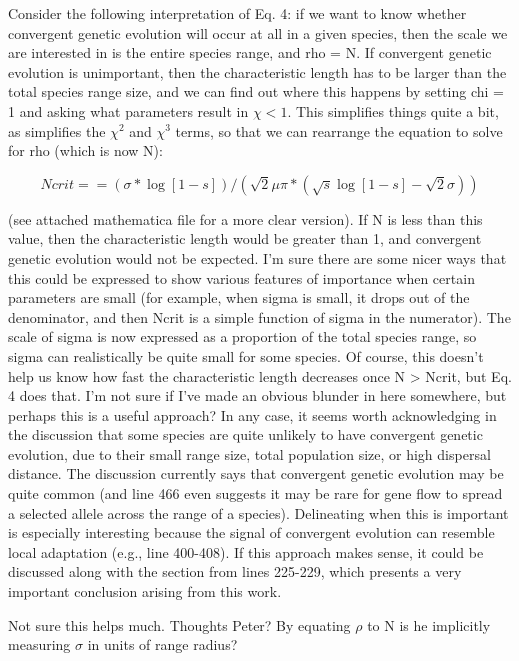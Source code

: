 \documentclass[12pt,letterpaper]{article}
\newcommand{\gc}[1]{{ \color{red} #1}}
\begin{document}
Consider the following interpretation of Eq. 4: if we want to know whether convergent genetic evolution will occur at all in a given species, then the scale we are interested in is the entire species range, and rho = N. If convergent genetic evolution is unimportant, then the characteristic length has to be larger than the total species range size, and we can find out where this happens by setting chi = 1 and asking what parameters result in $\chi < 1$. This simplifies things quite a bit, as simplifies the $\chi^2$ and $\chi^3$ terms, so that we can rearrange the equation to solve for rho (which is now N):

$$Ncrit == (\sigma * \log[1-s]) / (\sqrt{2}  \mu  \pi * (\sqrt{s} \log[1-s] - \sqrt{2}\sigma) )$$

(see attached mathematica file for a more clear version). If N is less than this value, then the characteristic length would be greater than 1, and convergent genetic evolution would not be expected. I'm sure there are some nicer ways that this could be expressed to show various features of importance when certain parameters are small (for example, when sigma is small, it drops out of the denominator, and then Ncrit is a simple function of sigma in the numerator). The scale of sigma is now expressed as a proportion of the total species range, so sigma can realistically be quite small for some species. Of course, this doesn't help us know how fast the characteristic length decreases once N > Ncrit, but Eq. 4 does that. I'm not sure if I've made an obvious blunder in here somewhere, but perhaps this is a useful approach? In any case, it seems worth acknowledging in the discussion that some species are quite unlikely to have convergent genetic evolution, due to their small range size, total population size, or high dispersal distance. The discussion currently says that convergent genetic evolution may be quite common (and line 466 even suggests it may be rare for gene flow to spread a selected allele across the range of a species). Delineating when this is important is especially interesting because the signal of convergent evolution can resemble local adaptation (e.g., line 400-408). If this approach makes sense, it could be discussed along with the section from lines 225-229, which presents a very important conclusion arising from this work.


\gc{Not sure this helps much. Thoughts Peter? By equating $\rho$ to N is he implicitly measuring $\sigma$ in units of range radius?}
\end{document}
